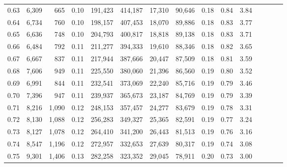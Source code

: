 \begin{tabular}{rrrcrrrrrrrrrrr}
0.63 &   6,309 &    665 &                                       0.10 &  191,423 &  414,187 &   17,310 &   90,646 &  0.18 &  0.84 &                         3.84 \\
0.64 &   6,734 &    760 &                                       0.10 &  198,157 &  407,453 &   18,070 &   89,886 &  0.18 &  0.83 &                         3.77 \\
0.65 &   6,636 &    748 &                                       0.10 &  204,793 &  400,817 &   18,818 &   89,138 &  0.18 &  0.83 &                         3.71 \\
0.66 &   6,484 &    792 &                                       0.11 &  211,277 &  394,333 &   19,610 &   88,346 &  0.18 &  0.82 &                         3.65 \\
0.67 &   6,667 &    837 &                                       0.11 &  217,944 &  387,666 &   20,447 &   87,509 &  0.18 &  0.81 &                         3.59 \\
0.68 &   7,606 &    949 &                                       0.11 &  225,550 &  380,060 &   21,396 &   86,560 &  0.19 &  0.80 &                         3.52 \\
0.69 &   6,991 &    844 &                                       0.11 &  232,541 &  373,069 &   22,240 &   85,716 &  0.19 &  0.79 &                         3.46 \\
0.70 &   7,396 &    947 &                                       0.11 &  239,937 &  365,673 &   23,187 &   84,769 &  0.19 &  0.79 &                         3.39 \\
0.71 &   8,216 &  1,090 &                                       0.12 &  248,153 &  357,457 &   24,277 &   83,679 &  0.19 &  0.78 &                         3.31 \\
0.72 &   8,130 &  1,088 &                                       0.12 &  256,283 &  349,327 &   25,365 &   82,591 &  0.19 &  0.77 &                         3.24 \\
0.73 &   8,127 &  1,078 &                                       0.12 &  264,410 &  341,200 &   26,443 &   81,513 &  0.19 &  0.76 &                         3.16 \\
0.74 &   8,547 &  1,196 &                                       0.12 &  272,957 &  332,653 &   27,639 &   80,317 &  0.19 &  0.74 &                         3.08 \\
0.75 &   9,301 &  1,406 &                                       0.13 &  282,258 &  323,352 &   29,045 &   78,911 &  0.20 &  0.73 &                         3.00 \\

\end{tabular}
